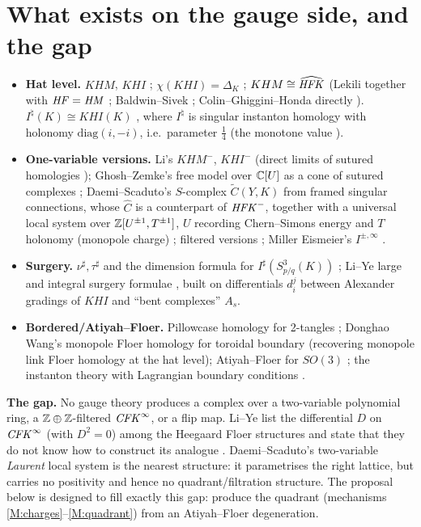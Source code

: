 \section{What exists on the gauge side, and the gap}\label{sec:landscape}

\begin{itemize}[leftmargin=2em]
\item \textbf{Hat level.} $KHM$, $KHI$ \cite{KM-sutures}; $\chi(KHI)=\Delta_K$ \cite{KM-alex,Lim};
$KHM\cong\widehat{\mathit{HFK}}$ (Lekili together with $\mathit{HF}=\mathit{HM}$ \cite{Lekili,KLT}; Baldwin--Sivek \cite{BS-equiv};
Colin--Ghiggini--Honda directly \cite{CGH-sutured}).  $I^\natural(K)\cong KHI(K)$ \cite{KM-unknot},
where $I^\natural$ is singular instanton homology with holonomy $\mathrm{diag}(i,-i)$, i.e.\ parameter
$\tfrac14$ (the monotone value \cite{KM-knothom}).
\item \textbf{One-variable versions.} Li's $KHM^-$, $KHI^-$ (direct limits of sutured homologies
\cite{Li-minus}); Ghosh--Zemke's free model over $\mathbb{C}[U]$ as a cone of sutured complexes \cite{GZ};
Daemi--Scaduto's $S$-complex $\tilde C(Y,K)$ from framed singular connections, whose $\hat C$
is a counterpart of $\mathit{HFK}^-$, together with a universal local system over $\mathbb{Z}[U^{\pm1},T^{\pm1}]$, $U$
recording Chern--Simons energy and $T$ holonomy (monopole charge) \cite{DS-equiv}; filtered
versions \cite{DS-clasp,DISST}; Miller Eismeier's $I^{\pm,\infty}$ \cite{ME,DME}.
\item \textbf{Surgery.} $\nu^\sharp,\tau^\sharp$ and the dimension formula for $I^\sharp(S^3_{p/q}(K))$
\cite{BS-conc}; Li--Ye large and integral surgery formulae \cite{LY-large,LY-surgery}, built on
differentials $d_i^j$ between Alexander gradings of $KHI$ and ``bent complexes'' $A_s$.
\item \textbf{Bordered/Atiyah--Floer.} Pillowcase homology for 2-tangles
\cite{HHK1,HHK2,CHKK}; Donghao Wang's monopole Floer homology for toroidal boundary \cite{Wang}
(recovering monopole link Floer homology at the hat level); Atiyah--Floer for $SO(3)$ \cite{DFL};
the instanton theory with Lagrangian boundary conditions \cite{SW-lag}.
\end{itemize}

\textbf{The gap.}  No gauge theory produces a complex over a two-variable polynomial ring, a
$\mathbb{Z}\oplus\mathbb{Z}$-filtered $\mathit{CFK}^\infty$, or a flip map.  Li--Ye list the differential $D$ on
$\mathit{CFK}^\infty$ (with $D^2=0$) among the Heegaard Floer structures and state that they do not know how to
construct its analogue \cite{LY-large}.  Daemi--Scaduto's two-variable \emph{Laurent} local system is the
nearest structure: it parametrises the right lattice, but carries no positivity and hence no
quadrant/filtration structure.  The proposal below is designed to fill exactly this gap: produce the
quadrant (mechanisms \ref{M:charges}--\ref{M:quadrant}) from an Atiyah--Floer degeneration.
